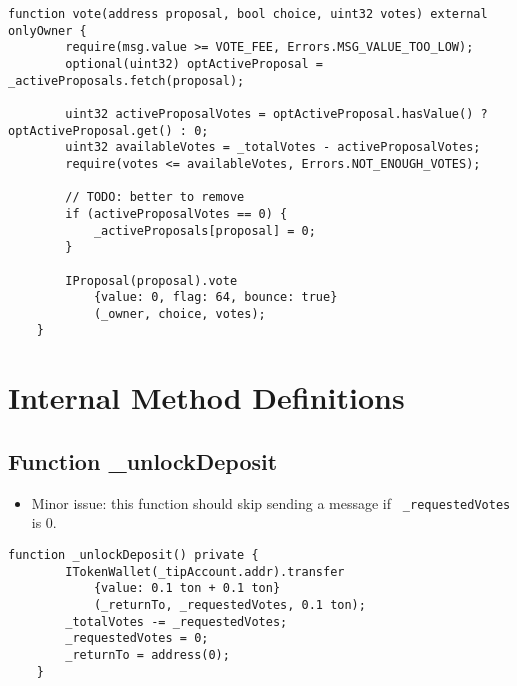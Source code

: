 \begin{lstlisting}[firstnumber=55]
    function vote(address proposal, bool choice, uint32 votes) external onlyOwner {
        require(msg.value >= VOTE_FEE, Errors.MSG_VALUE_TOO_LOW);
        optional(uint32) optActiveProposal = _activeProposals.fetch(proposal);

        uint32 activeProposalVotes = optActiveProposal.hasValue() ? optActiveProposal.get() : 0;
        uint32 availableVotes = _totalVotes - activeProposalVotes;
        require(votes <= availableVotes, Errors.NOT_ENOUGH_VOTES);

        // TODO: better to remove
        if (activeProposalVotes == 0) {
            _activeProposals[proposal] = 0;
        }
        
        IProposal(proposal).vote
            {value: 0, flag: 64, bounce: true}
            (_owner, choice, votes);
    }
\end{lstlisting}

\section{Internal Method Definitions}

\subsection{Function \_{}unlockDeposit}

\begin{itemize}
\item Minor issue: this function should skip sending a message if {\tt
  \_requestedVotes} is 0.
\end{itemize}

\begin{lstlisting}[firstnumber=146]
    function _unlockDeposit() private {
        ITokenWallet(_tipAccount.addr).transfer
            {value: 0.1 ton + 0.1 ton}
            (_returnTo, _requestedVotes, 0.1 ton);
        _totalVotes -= _requestedVotes;
        _requestedVotes = 0;
        _returnTo = address(0);
    }
\end{lstlisting}
